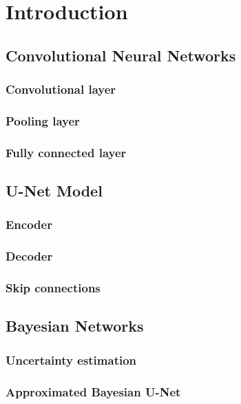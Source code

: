 \chapter{Introduction}


\section{Convolutional Neural Networks}
\subsection{Convolutional layer}
\subsection{Pooling layer}
\subsection{Fully connected layer}

\section{U-Net Model}
\subsection{Encoder}
\subsection{Decoder}
\subsection{Skip connections}

\section{Bayesian Networks}
\subsection{Uncertainty estimation}
\subsection{Approximated Bayesian U-Net}


